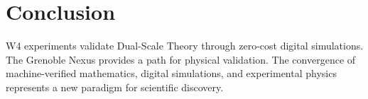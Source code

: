 \documentclass[11pt, twocolumn]{article}
\begin{document}
\section{Conclusion}
W4 experiments validate Dual-Scale Theory through zero-cost digital simulations. The Grenoble Nexus provides a path for physical validation. The convergence of machine-verified mathematics, digital simulations, and experimental physics represents a new paradigm for scientific discovery.



\end{document}
